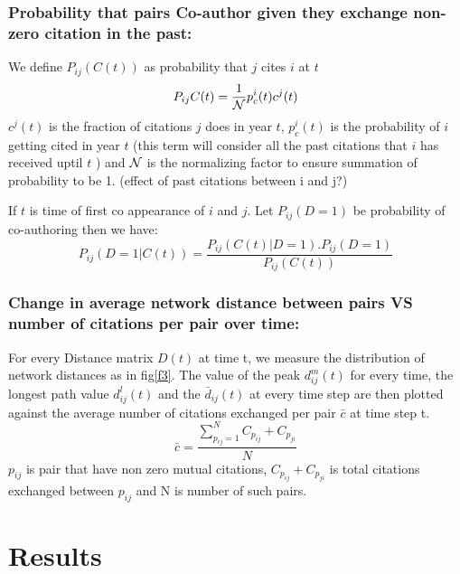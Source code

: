 \documentclass[aps, pre, twocolumn, nofootinbib]{revtex4-1}
\begin{document}
\subsubsection{Probability that pairs Co-author given they exchange non-zero citation in the past:}
We define $P_{ij}(C(t))$ as probability that $j$ cites $i$ at $t$
\begin{equation}
P_{ij}C(t) = \frac{1}{{\cal N}}p_c^i(t)c^j(t)  
\end{equation}
$c^j(t)$ is the fraction of citations $j$ does in year $t$, $p_c^i(t)$ is the probability of $i$ getting cited in year $t$ (this term will consider all the past citations that $i$ has received uptil $t$ ) and ${\cal N}$ is the normalizing factor to ensure summation of probability to be 1. {\color{red}(effect of past citations between i and j?)}

If $t$ is time of first co appearance of $i$ and $j$. Let $P_{ij}(D=1)$ be probability of co-authoring then we have:
\begin{equation}
P_{ij}(D=1|C(t)) = \frac{P_{ij}(C(t)|D=1).P_{ij}(D=1)}{P_{ij}(C(t))}
\end{equation}

\subsubsection{Change in average network distance between pairs VS number of citations per pair over time:}
For every Distance matrix $D(t)$ at time t, we measure the distribution of network distances as in fig\ref{f3}. The value of the peak $d^m_{ij}(t)$ for every time, the longest path value $d^l_{ij}(t)$ and the $\bar{d}_{ij}(t)$ at every time step are then plotted against the average number of citations exchanged per pair $\bar{c}$ at time step t.
\begin{equation}
\bar{c} = \frac{\sum_{p_{ij}=1}^{N} C_{p_{ij}} + C_{p_{ji}}}{N} 
\end{equation}
$p_{ij}$ is pair that have non zero mutual citations, $C_{p_{ij}} + C_{p_{ji}}$ is total citations exchanged between $p_{ij}$ and N is number of such pairs.
\section{Results}
\end{document}
